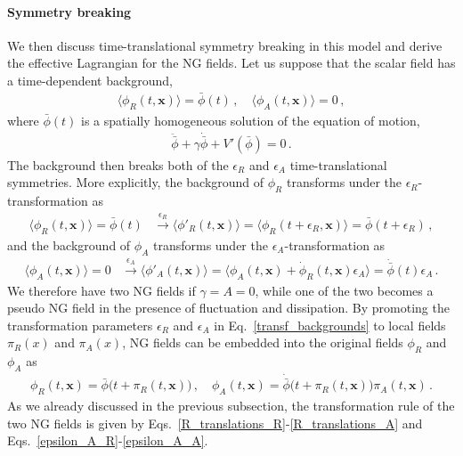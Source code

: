 \documentclass[a4paper,11pt]{article}
\begin{document}
\paragraph{Symmetry breaking}
We then discuss time-translational symmetry breaking in this model
and derive the effective Lagrangian for the NG fields.
Let us suppose that the scalar field has a time-dependent background,
\begin{align}
\langle\phi_R (t,\mathbf{x})\rangle
 =\bar{\phi}(t)\,, \quad \langle\phi_A (t,\mathbf{x})\rangle=0\,,
\end{align}
where $\bar{\phi}(t)$ is a spatially homogeneous solution 
of the equation of motion,
\begin{align}
\label{EMO:phibar}
\ddot{\bar{\phi}}+\gamma\dot{\bar{\phi}}+V'(\bar{\phi})=0\,.
\end{align}
The background then breaks both of the $\epsilon_R$ and $\epsilon_A$ time-translational symmetries. More explicitly, the background of $\phi_R$ transforms under the $\epsilon_R$-transformation as
\begin{align}
\label{transf_backgrounds}
 \langle\phi_R (t,\mathbf{x})\rangle 
 = \bar{\phi}(t) &\xrightarrow { \epsilon_R } \langle \phi'_R (t,\mathbf{x})\rangle =
 \langle \phi_R(t+\epsilon_R,\mathbf{x})\rangle=\bar{\phi}(t+\epsilon_R) 
 \,,
\end{align}
and the background of $\phi_A$ transforms under the $\epsilon_A$-transformation as
\begin{align}
 \langle\phi_A (t,\mathbf{x})\rangle 
 = 0  &\xrightarrow { \epsilon_A } \langle \phi'_A (t,\mathbf{x})\rangle =
 \langle \phi_A(t,\mathbf{x})+\dot{\phi}_R (t,\mathbf{x})\epsilon_A\rangle=\dot{\bar{\phi}}(t)\epsilon_A\,.
\end{align}
We therefore have two NG fields if $\gamma=A=0$, 
while one of the two becomes a pseudo NG field 
in the presence of fluctuation and dissipation.
By promoting the transformation parameters $\epsilon_R$ and $\epsilon_A$ 
in Eq.~\eqref{transf_backgrounds} to local fields $\pi_R (x)$ and $\pi_A (x)$, 
NG fields can be embedded into the original fields $\phi_R$ and $\phi_A$ as
\begin{align}
\label{phi_piRA}
 \phi_R(t,\mathbf{x}) 
 = \bar{\phi} \big( t+\pi_R(t,\mathbf{x}) \big)\,,
 \quad
 \phi_A(t,\mathbf{x}) 
 = \dot{\bar{\phi}} \big(t+\pi_R(t,\mathbf{x}) \big) \pi_A (t,\mathbf{x}) \,.
\end{align}
As we already discussed in the previous subsection, 
the transformation rule of the two NG fields is 
given by Eqs.~\eqref{R_translations_R}-\eqref{R_translations_A} 
and Eqs.~\eqref{epsilon_A_R}-\eqref{epsilon_A_A}.
\end{document}
